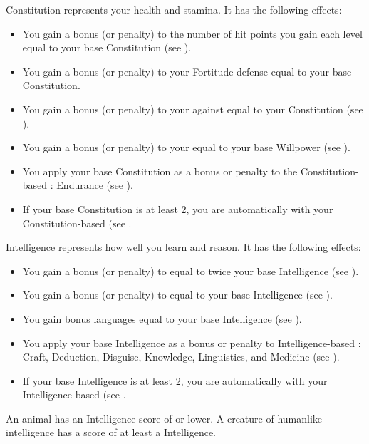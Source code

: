        \label{Constitution}
        {
            Constitution represents your health and stamina.
            It has the following effects:
            \begin{itemize}
                \item You gain a bonus (or penalty) to the number of hit points you gain each level equal to your base Constitution (see ).
                \item You gain a bonus (or penalty) to your Fortitude defense equal to your base Constitution.
                \item You gain a bonus (or penalty) to your  against  equal to your Constitution (see ).
                \item You gain a bonus (or penalty) to your  equal to your base Willpower (see ).
                \item You apply your base Constitution as a bonus or penalty to the Constitution-based : Endurance (see ).
                \item If your base Constitution is at least 2, you are automatically  with your Constitution-based  (see .
            \end{itemize}
        }

        \label{Intelligence}
        {
            Intelligence represents how well you learn and reason.
            It has the following effects:

            \begin{itemize}
                \item You gain a bonus (or penalty) to  equal to twice your base Intelligence (see ).
                \item You gain a bonus (or penalty) to  equal to your base Intelligence (see ).
                \item You gain bonus languages equal to your base Intelligence (see ).
                \item You apply your base Intelligence as a bonus or penalty to Intelligence-based : Craft, Deduction, Disguise, Knowledge, Linguistics, and Medicine (see ).
                \item If your base Intelligence is at least 2, you are automatically  with your Intelligence-based  (see .
            \end{itemize}

            \par An animal has an Intelligence score of  or lower.
            A creature of humanlike intelligence has a score of at least a  Intelligence.
        }

